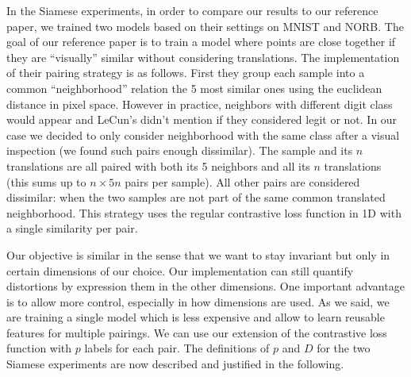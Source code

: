 \documentclass[a4paper,12pt]{report}
\begin{document}
In the Siamese experiments, in order to compare our results to our reference paper, we trained two models based on their settings on MNIST and NORB.
The goal of our reference paper is to train a model where points are close together if they are ``visually'' similar without considering translations.
The implementation of their pairing strategy is as follows.
First they group each sample into a common ``neighborhood'' relation the 5 most similar ones using the euclidean distance in pixel space.
However in practice, neighbors with different digit class would appear and LeCun's didn't mention if they considered legit or not.
In our case we decided to only consider neighborhood with the same class after a visual inspection (we found such pairs enough dissimilar).
The sample and its $n$ translations are all paired with both its 5 neighbors and all its $n$ translations (this sums up to $n \times 5n$ pairs per sample).
All other pairs are considered dissimilar: when the two samples are not part of the same common translated neighborhood.
This strategy uses the regular contrastive loss function in 1D with a single similarity per pair.

Our objective is similar in the sense that we want to stay invariant but only in certain dimensions of our choice.
Our implementation can still quantify distortions by expression them in the other dimensions.
One important advantage is to allow more control, especially in how dimensions are used.
As we said, we are training a single model which is less expensive and allow to learn reusable features for multiple pairings.
We can use our extension of the contrastive loss function with $p$ labels for each pair.
The definitions of $p$ and $D$ for the two Siamese experiments are now described and justified in the following.
\end{document}
